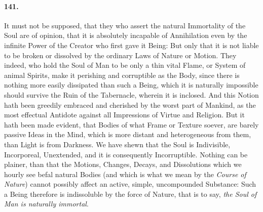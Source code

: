 \documentclass[]{article}
\newenvironment{sectionbody}{}{}
\begin{document}
\begin{sectionbody}
\paragraph{141.} It must not be supposed, that they who assert the natural
Immortality of the Soul are of opinion, that it is absolutely
incapable of Annihilation even by the infinite Power of the
{\sc Creator} who first gave it Being: But only that it is not liable
to be broken or dissolved by the ordinary Laws of Nature or
Motion.  They indeed, who hold the Soul of Man to be only a thin
vital Flame, or System of animal Spirits, make it perishing and
corruptible as the Body, since there is nothing more easily
dissipated than such a Being, which it is naturally impossible
should survive the Ruin of the Tabernacle, wherein it is
inclosed.  And this Notion hath been greedily embraced and
cherished by the worst part of Mankind, as the most effectual
Antidote against all Impressions of Virtue and Religion.  But it
hath been made evident, that Bodies of what Frame or Texture
soever, are barely passive Ideas in the Mind, which is more
distant and heterogeneous from them, than Light is from Darkness.
We have shewn that the Soul is Indivisible, Incorporeal,
Unextended, and it is consequently Incorruptible.  Nothing can be
plainer, than that the Motions, Changes, Decays, and Dissolutions
which we hourly see befal natural Bodies (and which is what we
mean by the \emph{Course of Nature}) cannot possibly affect an
active, simple, uncompounded Substance: Such a Being therefore is
indissoluble by the force of Nature, that is to say, \emph{the Soul
of Man is naturally immortal}.




\end{sectionbody}
\end{document}
